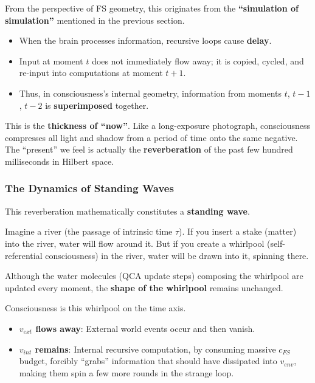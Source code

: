 From the perspective of FS geometry, this originates from the \textbf{``simulation of simulation''} mentioned in the previous section.

\begin{itemize}
\item When the brain processes information, recursive loops cause \textbf{delay}.

\item Input at moment $t$ does not immediately flow away; it is copied, cycled, and re-input into computations at moment $t+1$.

\item Thus, in consciousness's internal geometry, information from moments $t$, $t-1$, $t-2$ is \textbf{superimposed} together.
\end{itemize}

This is the \textbf{thickness of ``now''}. Like a long-exposure photograph, consciousness compresses all light and shadow from a period of time onto the same negative. The ``present'' we feel is actually the \textbf{reverberation} of the past few hundred milliseconds in Hilbert space.

\subsubsection{The Dynamics of Standing Waves}

This reverberation mathematically constitutes a \textbf{standing wave}.

Imagine a river (the passage of intrinsic time $\tau$). If you insert a stake (matter) into the river, water will flow around it. But if you create a whirlpool (self-referential consciousness) in the river, water will be drawn into it, spinning there.

Although the water molecules (QCA update steps) composing the whirlpool are updated every moment, the \textbf{shape of the whirlpool} remains unchanged.

Consciousness is this whirlpool on the time axis.

\begin{itemize}
\item \textbf{$v_{ext}$ flows away}: External world events occur and then vanish.

\item \textbf{$v_{int}$ remains}: Internal recursive computation, by consuming massive $c_{FS}$ budget, forcibly ``grabs'' information that should have dissipated into $v_{env}$, making them spin a few more rounds in the strange loop.
\end{itemize}

